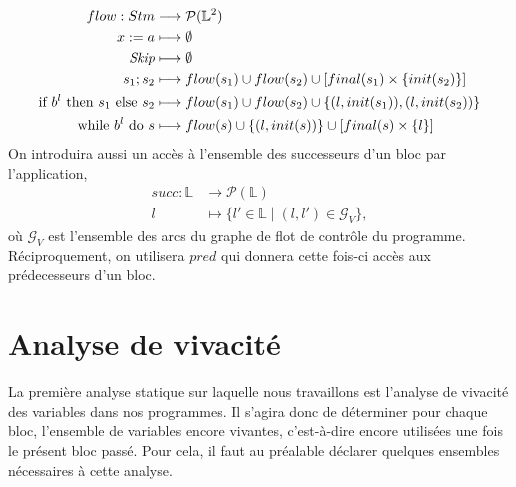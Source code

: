 \documentclass[a4paper, 11pt]{article}
\begin{document}
\begin{align*}
	flow : Stm &\longrightarrow \mathcal{P}(\mathbb{L}^2) \\
	{x}\space:=\space{a} &\longmapsto \emptyset \\
	\textit{Skip} &\longmapsto \emptyset \\
	{s_1}\space;\space{s_2} &\longmapsto flow(s_1) \cup flow(s_2) \cup [final(s_1)\times\{init(s_2)\}] \\
	\text{if }{b^l}\text{ then }{s_1}\text{ else }{s_2} &\longmapsto flow(s_1)\cup flow(s_2)\cup\{(l, init(s_1)),(l, init(s_2))\} \\
	\text{while }{b^l}\text{ do }{s} &\longmapsto flow(s)\cup\{(l,init(s))\}\cup[final(s)\times\{l\}]
\end{align*}
On introduira aussi un accès à l'ensemble des successeurs d'un bloc par l'application,
\begin{align*}
	succ : \mathbb{L} &\longrightarrow \mathcal{P}(\mathbb{L})\\
	l &\longmapsto \{l' \in \mathbb{L} \mid (l, l') \in \mathcal{G}_V\},
\end{align*}
où $\mathcal{G}_V$ est l'ensemble des arcs du graphe de flot de contrôle du programme. Réciproquement, on 
utilisera $pred$ qui donnera cette fois-ci accès aux prédecesseurs d'un bloc.

\section{Analyse de vivacité}
La première analyse statique sur laquelle nous travaillons est l'analyse de vivacité des variables dans nos programmes. 
Il s'agira donc de déterminer pour chaque bloc, l'ensemble de variables encore vivantes, c'est-à-dire
encore utilisées une fois le présent bloc passé. Pour cela, il faut au préalable déclarer quelques ensembles 
nécessaires à cette analyse.
\end{document}

